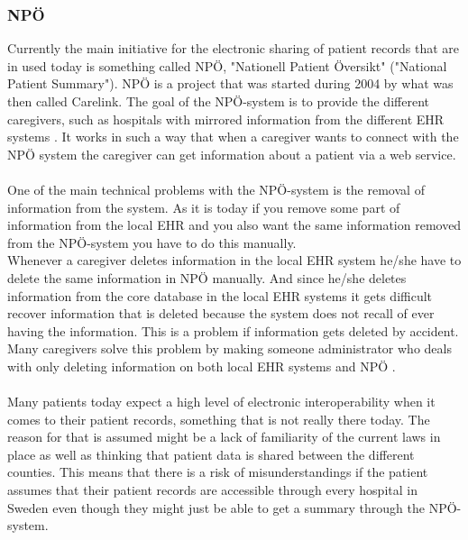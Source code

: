 \documentclass[14pt]{article}
\begin{document}
\subsubsection{NPÖ}
Currently the main initiative for the electronic sharing of patient records that are in used today is something called NPÖ, "Nationell Patient Översikt" ("National Patient Summary"). NPÖ is a project that was started during 2004 by what was then called Carelink\cite{ViktorJernelov}. The goal of the NPÖ-system is to provide the different caregivers, such as hospitals with mirrored information from the different \gls{EHR} systems \cite{ViktorJernelov}. It works in such a way that when a caregiver wants to connect with the NPÖ system the caregiver can get information about a patient via a web service. 
\\\\
One of the main technical problems with the NPÖ-system is the removal of information from the system. As it is today if you remove some part of information from the local \gls{EHR} and you also want the same information removed from the NPÖ-system you have to do this manually.
\\ %
Whenever a caregiver deletes information in the local \gls{EHR} system he/she have to delete the same information in NPÖ manually. And since he/she deletes information from the core database in the local \gls{EHR} systems it gets difficult recover information that is deleted because the system does not recall of ever having the information. This is a problem if information gets deleted by accident. Many caregivers solve this problem by making someone administrator who deals with only deleting information on both local \gls{EHR} systems and NPÖ  \cite{ViktorJernelov}.
\\\\
Many patients today expect a high level of electronic \gls{interoperability} when it comes to their patient records\cite{EPJ2}, something that is not really there today. The reason for that is assumed might be a lack of familiarity of the current laws in place as well as thinking that patient data is shared between the different counties. This means that there is a risk of misunderstandings if the patient assumes that their patient records are accessible through every hospital in Sweden even though they might just be able to get a summary through the NPÖ-system.
\end{document}
